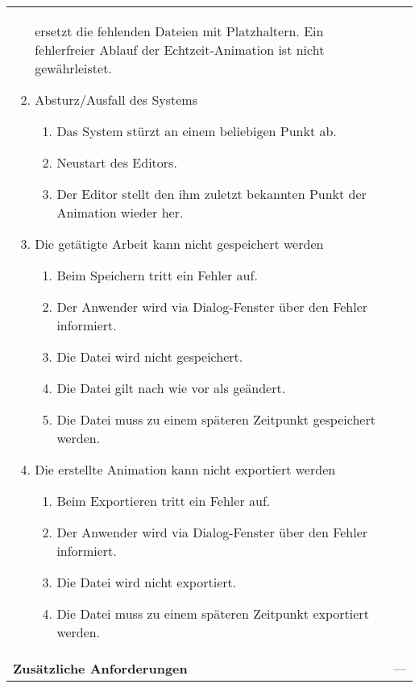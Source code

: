 \begin{longtabu}{p{0.5\textwidth}p{0.5\textwidth}}
\begin{enumerate}[label= (\alph*)]
{\begin{enumerate}[label= (\roman*)]
{                            ersetzt die fehlenden Dateien mit
                            Platzhaltern. Ein fehlerfreier Ablauf der
                            Echtzeit-Animation ist nicht gewährleistet.}
                \end{enumerate}
            }
            \item{Absturz/Ausfall des Systems
                \begin{enumerate}[label= (\roman*)]
                        \item{Das System stürzt an einem beliebigen Punkt
                                ab.}
                        \item{Neustart des Editors.}
                        \item{Der Editor stellt den ihm zuletzt bekannten
                                Punkt der Animation wieder her.}
                \end{enumerate}
            }
            \item{Die getätigte Arbeit kann nicht gespeichert werden
                \begin{enumerate}[label= (\roman*)]
                    \item{Beim Speichern tritt ein Fehler auf.}
                    \item{Der Anwender wird via Dialog-Fenster über den Fehler
                            informiert.}
                    \item{Die Datei wird nicht gespeichert.}
                    \item{Die Datei gilt nach wie vor als geändert.}
                    \item{Die Datei muss zu einem späteren Zeitpunkt
                            gespeichert werden.}
                \end{enumerate}
            }
            \item{Die erstellte Animation kann nicht exportiert werden
                \begin{enumerate}[label= (\roman*)]
                    \item{Beim Exportieren tritt ein Fehler auf.}
                    \item{Der Anwender wird via Dialog-Fenster über den Fehler
                            informiert.}
                    \item{Die Datei wird nicht exportiert.}
                    \item{Die Datei muss zu einem späteren Zeitpunkt
                            exportiert werden.}
                \end{enumerate}
            }
        \end{enumerate} \\
    \cmidrule(r){1-1}\cmidrule(lr){2-2}
        \textbf{Zusätzliche Anforderungen} &
        ---\\
    \bottomrule
\end{longtabu}
